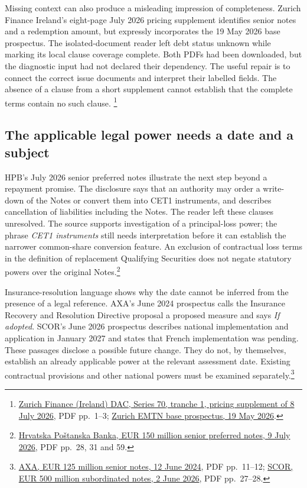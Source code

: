 Missing context can also produce a misleading impression of completeness.
Zurich Finance Ireland's eight-page July 2026 pricing supplement identifies
senior notes and a redemption amount, but expressly incorporates the
19 May 2026 base prospectus. The isolated-document reader left debt status
unknown while marking its local clause coverage complete. Both PDFs had
been downloaded, but the diagnostic input had not declared their dependency.
The useful repair is to connect the correct issue documents and interpret
their labelled fields. The absence of a clause from a short supplement
cannot establish that the complete terms contain no such clause.
\footnote{\href{../prospectus/difficulty-2026-10-04/pdfs/case-105489584.pdf}
{Zurich Finance (Ireland) DAC, Series 70, tranche 1, pricing supplement
of 8 July 2026}, PDF pp.~1--3;
\href{../prospectus/difficulty-2026-10-04/pdfs/case-105392707.pdf}
{Zurich EMTN base prospectus, 19 May 2026}.}

\subsection{The applicable legal power needs a date and a subject}

HPB's July 2026 senior preferred notes illustrate the next step beyond a
repayment promise. The disclosure says that an authority may order a
write-down of the Notes or convert them into CET1 instruments, and describes
cancellation of liabilities including the Notes. The reader left these
clauses unresolved. The source supports investigation of a principal-loss
power; the phrase \emph{CET1 instruments} still needs interpretation before it
can establish the narrower common-share conversion feature. An exclusion
of contractual loss terms in the definition of replacement Qualifying
Securities does not negate statutory powers over the original
Notes.\footnote{\href{../prospectus/difficulty-2026-10-04/pdfs/case-105490784.pdf}
{Hrvatska Poštanska Banka, EUR 150 million senior preferred notes,
9 July 2026}, PDF pp.~28, 31 and 59.}

Insurance-resolution language shows why the date cannot be inferred from
the presence of a legal reference. AXA's June 2024 prospectus calls the
Insurance Recovery and Resolution Directive proposal a proposed measure
and says \emph{If adopted}. SCOR's June 2026 prospectus describes national
implementation and application in January 2027 and states that French
implementation was pending. These passages disclose a possible future
change. They do not, by themselves, establish an already applicable power
at the relevant assessment date. Existing contractual provisions and other
national powers must be examined separately.\footnote{
\href{../prospectus/difficulty-2026-10-04/pdfs/case-104224021.pdf}
{AXA, EUR 125 million senior notes, 12 June 2024}, PDF pp.~11--12;
\href{../prospectus/difficulty-2026-10-04/pdfs/case-105421783.pdf}
{SCOR, EUR 500 million subordinated notes, 2 June 2026}, PDF pp.~27--28.}

